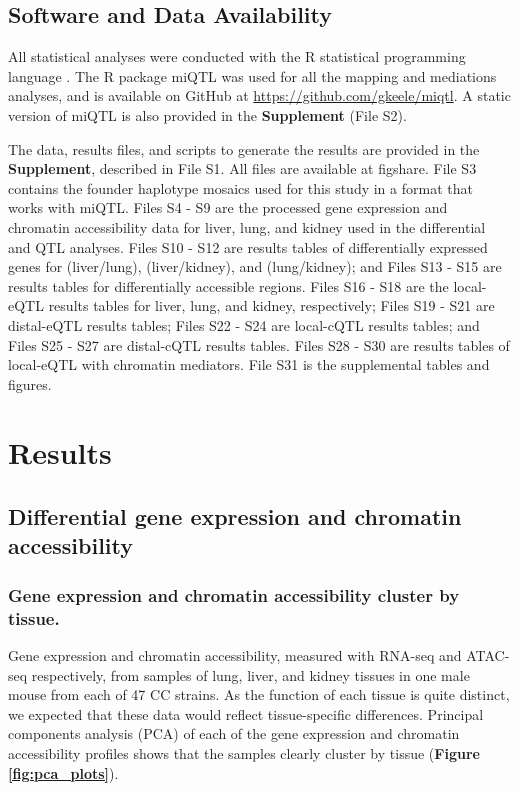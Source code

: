 \documentclass[9pt,twocolumn,twoside]{gsajnl}
\newcommand{\WV}[2]{\textcolor{red}{#1\footnote{\textcolor{red}{WV: #2}}}}
\newcommand{\WVinline}[1]{\textcolor{red}{#1}}
\begin{document}
\subsection{Software and Data Availability}

All statistical analyses were conducted with the R statistical programming language \citep{RSoftware2019}. The R package miQTL was used for all the mapping and mediations analyses, and is available on GitHub at \url{https://github.com/gkeele/miqtl}. A static version of miQTL is also provided in the \textbf{Supplement} (File S2).

The data, results files, and scripts to generate the results are provided in the \textbf{Supplement}, described in File S1. All files are available at figshare. File S3 contains the founder haplotype mosaics used for this study in a format that works with miQTL. Files S4 - S9 are the processed gene expression and chromatin accessibility data for liver, lung, and kidney used in the differential and QTL analyses. Files S10 - S12 are results tables of differentially expressed genes for (liver/lung), (liver/kidney), and (lung/kidney); and Files S13 - S15 are results tables for differentially accessible regions. Files S16 - S18 are the local-eQTL results tables for liver, lung, and kidney, respectively; Files S19 - S21 are distal-eQTL results tables; Files S22 - S24 are local-cQTL results tables; and Files S25 - S27 are distal-cQTL results tables. Files S28 - S30 are results tables of local-eQTL with chromatin mediators. File S31 is the supplemental tables and figures.

\section{Results}


\subsection{Differential gene expression and chromatin accessibility} %

\subsubsection{Gene expression and chromatin accessibility cluster by tissue.}
Gene expression and chromatin accessibility, measured with RNA-seq and ATAC-seq respectively, from samples of lung, liver, and kidney tissues in one male mouse from each of 47 CC strains. As the function of each tissue is quite distinct, we expected that these data would reflect tissue-specific differences. Principal components analysis (PCA) of each of the gene expression and chromatin accessibility profiles shows that the samples clearly cluster by tissue (\textbf{Figure \ref{fig:pca_plots}}). 
\end{document}
